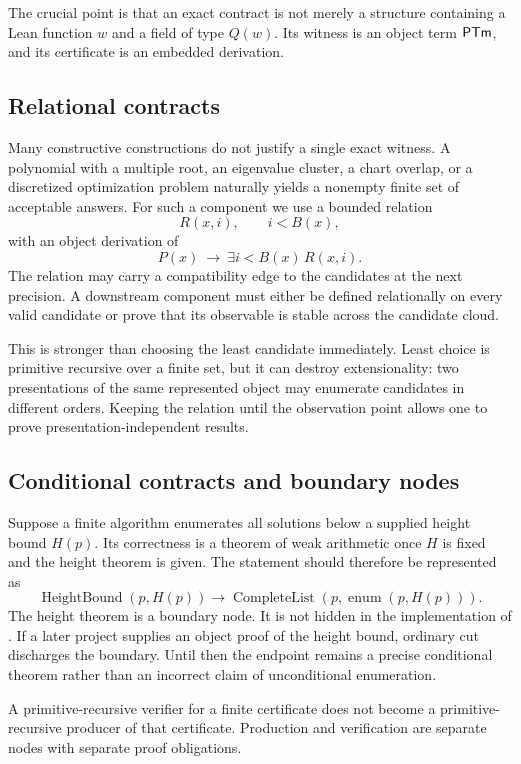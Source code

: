 The crucial point is that an exact contract is not merely a structure containing a
Lean function \(w\) and a field of type \(Q(w)\).  Its witness is an object term
\(\mathsf{PTm}\), and its certificate is an embedded derivation.

\subsection{Relational contracts}

Many constructive constructions do not justify a single exact witness.  A polynomial
with a multiple root, an eigenvalue cluster, a chart overlap, or a discretized
optimization problem naturally yields a nonempty finite set of acceptable answers.
For such a component we use a bounded relation
\[
  R(x,i), \qquad i<B(x),
\]
with an object derivation of
\[
  P(x)\ \longrightarrow\ \exists i<B(x)\,R(x,i).
\]
The relation may carry a compatibility edge to the candidates at the next precision.
A downstream component must either be defined relationally on every valid candidate or
prove that its observable is stable across the candidate cloud.

This is stronger than choosing the least candidate immediately.  Least choice is
primitive recursive over a finite set, but it can destroy extensionality: two
presentations of the same represented object may enumerate candidates in different
orders.  Keeping the relation until the observation point allows one to prove
presentation-independent results.

\subsection{Conditional contracts and boundary nodes}

Suppose a finite algorithm enumerates all solutions below a supplied height bound
\(H(p)\).  Its correctness is a theorem of weak arithmetic once \(H\) is fixed and the
height theorem is given.  The statement should therefore be represented as
\[
  \operatorname{HeightBound}(p,H(p))
  \longrightarrow
  \operatorname{CompleteList}(p,\operatorname{enum}(p,H(p))).
\]
The height theorem is a boundary node.  It is not hidden in the implementation of
.  If a later project supplies an object proof of the height bound, ordinary
cut discharges the boundary.  Until then the endpoint remains a precise conditional
theorem rather than an incorrect claim of unconditional enumeration.

\begin{principle}
A primitive-recursive verifier for a finite certificate does not become a
primitive-recursive producer of that certificate.  Production and verification are
separate nodes with separate proof obligations.
\end{principle}

